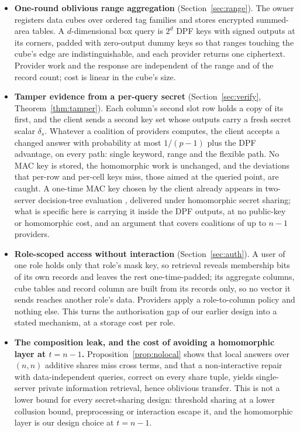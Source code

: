 \documentclass[a4paper,fleqn]{cas-sc}
\begin{document}
\begin{itemize}
\item \textbf{One-round oblivious range aggregation} (Section~\ref{sec:range}).
The owner registers data cubes over ordered tag families and stores encrypted
summed-area tables. A $d$-dimensional box query is $2^d$ DPF keys with signed
outputs at its corners, padded with zero-output dummy keys so that ranges
touching the cube's edge are indistinguishable, and each provider returns one
ciphertext. Provider work and the response are independent of the range and of
the record count; cost is linear in the cube's size.

\item \textbf{Tamper evidence from a per-query secret}
(Section~\ref{sec:verify}, Theorem~\ref{thm:tamper}). Each column's second slot
row holds a copy of its first, and the client sends a second key set whose
outputs carry a fresh secret scalar $\delta_s$. Whatever a coalition of
providers computes, the client accepts a changed answer with probability at
most $1/(p-1)$ plus the DPF advantage, on every path: single keyword, range and
the flexible path. No MAC key is stored, the homomorphic work is unchanged, and
the deviations that per-row and per-cell keys miss, those aimed at the queried
point, are caught. A one-time MAC key chosen by the client already appears in
two-server decision-tree evaluation \citep{li2026silent}, delivered under
homomorphic secret sharing; what is specific here is carrying it inside the DPF
outputs, at no public-key or homomorphic cost, and an argument that covers
coalitions of up to $n-1$ providers.

\item \textbf{Role-scoped access without interaction} (Section~\ref{sec:auth}).
A user of one role holds only that role's mask key, so retrieval reveals
membership bits of its own records and leaves the rest one-time-padded; its
aggregate columns, cube tables and record column are built from its records
only, so no vector it sends reaches another role's data. Providers apply a
role-to-column policy and nothing else. This turns the authorisation gap of our
earlier design into a stated mechanism, at a storage cost per role.

\item \textbf{The composition leak, and the cost of avoiding a homomorphic
layer at $t=n-1$.} Proposition~\ref{prop:nolocal} shows that local answers over
$(n,n)$ additive shares miss cross terms, and that a non-interactive repair with
data-independent queries, correct on every share tuple, yields single-server
private information retrieval, hence oblivious transfer. This is not a lower
bound for every secret-sharing design: threshold sharing at a lower collusion
bound, preprocessing or interaction escape it, and the homomorphic layer is our
design choice at $t=n-1$.


\end{itemize}
\end{document}
